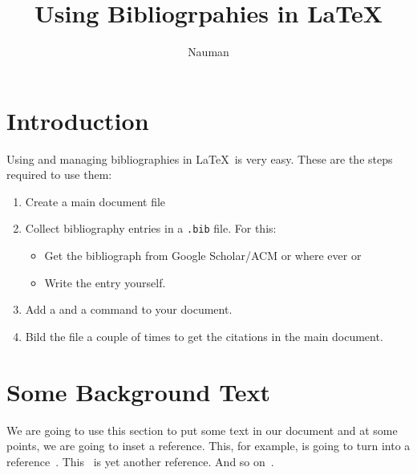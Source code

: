 \documentclass{article}
\begin{document}
\title{Using Bibliogrpahies in \LaTeX}
\author{Nauman}
\maketitle


\section{Introduction} 
Using and managing bibliographies in \LaTeX\ is very easy. These are the steps required to use them: 

\begin{enumerate}
	\item Create a main document file 
	\item Collect bibliography entries in a \verb|.bib| file. For this: 
	   \begin{itemize}
	     \item Get the bibliograph  from Google Scholar/ACM or where ever or 
	     \item Write the entry yourself. 
     \end{itemize}
	\item Add a \verb|| and a \verb|| command to your document. 
	\item Bild the file a couple of times to get the citations in the main document. 
\end{enumerate}

\section{Some Background Text}
We are going to use this section to put some text in our document and at some points, we are going to inset a reference. This, for example, is going to turn into a reference~\cite{Control-CDW-Okamoto-1992}. This~\cite{Lattice-Dynamics-Fehske-2000} is yet another reference. And so on~\cite{Dynamical-Monkowsky-2017}.







\end{document}
